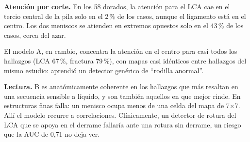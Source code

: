 \textbf{Atención por corte.} En los 58 dorados, la atención para el LCA cae en el tercio
central de la pila solo en el 2\,\% de los casos, aunque el ligamento está en el centro. Los
dos meniscos se atienden en extremos opuestos solo en el 43\,\% de los casos, cerca del azar.

El modelo A, en cambio, concentra la atención en el centro para casi todos los hallazgos
(LCA 67\,\%, fractura 79\,\%), con mapas casi idénticos entre hallazgos del mismo estudio:
aprendió un detector genérico de ``rodilla anormal''.

\textbf{Lectura.} B es anatómicamente coherente en los hallazgos que más resaltan en una
secuencia sensible a líquido, y son también aquellos en que mejor rinde. En estructuras finas
falla: un menisco ocupa menos de una celda del mapa de 7$\times$7. Allí el modelo recurre a
correlaciones. Clínicamente, un detector de rotura del LCA que se apoya en el derrame
fallaría ante una rotura sin derrame, un riesgo que la AUC de 0,71 no deja ver.
